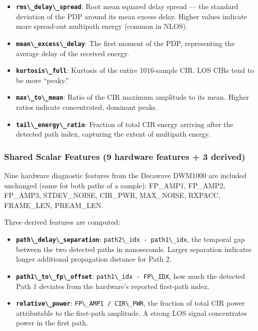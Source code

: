 \documentclass[12pt,a4paper]{article}
\newcommand{\passthrough}[1]{#1}
\providecommand{\passthrough}[1]{#1}
\providecommand{\tightlist}{%
  \setlength{\itemsep}{0pt}\setlength{\parskip}{0pt}}
\begin{document}
\begin{itemize}
\tightlist
\item
  \textbf{\passthrough{\lstinline!rms\_delay\_spread!}}: Root mean
  squared delay spread --- the standard deviation of the PDP around its
  mean excess delay. Higher values indicate more spread-out multipath
  energy (common in NLOS).
\item
  \textbf{\passthrough{\lstinline!mean\_excess\_delay!}}: The first
  moment of the PDP, representing the average delay of the received
  energy.
\item
  \textbf{\passthrough{\lstinline!kurtosis\_full!}}: Kurtosis of the
  entire 1016-sample CIR. LOS CIRs tend to be more ``peaky.''
\item
  \textbf{\passthrough{\lstinline!max\_to\_mean!}}: Ratio of the CIR
  maximum amplitude to its mean. Higher ratios indicate concentrated,
  dominant peaks.
\item
  \textbf{\passthrough{\lstinline!tail\_energy\_ratio!}}: Fraction of
  total CIR energy arriving after the detected path index, capturing the
  extent of multipath energy.
\end{itemize}

\subsubsection{Shared Scalar Features (9 hardware features + 3
derived)}\label{shared-scalar-features-9-hardware-features-3-derived}

Nine hardware diagnostic features from the Decawave DWM1000 are included
unchanged (same for both paths of a sample): FP\_AMP1, FP\_AMP2,
FP\_AMP3, STDEV\_NOISE, CIR\_PWR, MAX\_NOISE, RXPACC, FRAME\_LEN,
PREAM\_LEN.

Three derived features are computed:

\begin{itemize}
\tightlist
\item
  \textbf{\passthrough{\lstinline!path\_delay\_separation!}}:
  \passthrough{\lstinline!path2\_idx - path1\_idx!}, the temporal gap
  between the two detected paths in nanoseconds. Larger separation
  indicates longer additional propagation distance for Path 2.
\item
  \textbf{\passthrough{\lstinline!path1\_to\_fp\_offset!}}:
  \passthrough{\lstinline!path1\_idx - FP\_IDX!}, how much the detected
  Path 1 deviates from the hardware's reported first-path index.
\item
  \textbf{\passthrough{\lstinline!relative\_power!}}:
  \passthrough{\lstinline!FP\_AMP1 / CIR\_PWR!}, the fraction of total
  CIR power attributable to the first-path amplitude. A strong LOS
  signal concentrates power in the first path.
\end{itemize}
\end{document}
